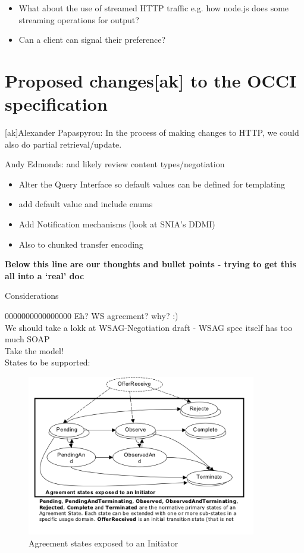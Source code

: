 \documentclass[12pt]{article}  %
\begin{document}
\begin{itemize}
\item What about the use of streamed HTTP traffic e.g. how node.js does some streaming operations for output? 
\item Can a client can signal their preference?
\end{itemize}

\section{Proposed changes[ak] to the OCCI specification}

{
\color{blue}
[ak]Alexander Papaspyrou:
In the process of making changes to HTTP, we could also do partial retrieval/update.

Andy Edmonds:
and likely review content types/negotiation
}

\begin{itemize}
\item Alter the Query Interface so default values can be defined for templating
\item  add default value and include enums
\item  Add Notification mechanisms (look at SNIA’s DDMI)
\item Also to chunked transfer encoding
\end{itemize}

\newpage
\hrulefill

{
\large
\bf
\color{red}
Below this line are our thoughts and bullet points - trying to get this all into a ‘real’ doc
}

\hrulefill


Considerations



\begin{tabbing}
0000\=0000\=0000\=0000 \kill
Eh? WS agreement? why? :) \\
	\>We should take a lokk at WSAG-Negotiation draft - WSAG spec itself has too much SOAP \\
	\>	\>Take the model! \\
	\>States to be supported: \\
\end{tabbing}

\begin{figure}
\centering
\includegraphics[width=10cm]{states.png}
\caption{\label{states} Agreement states exposed to an Initiator}
\end{figure}
	
\end{document}
